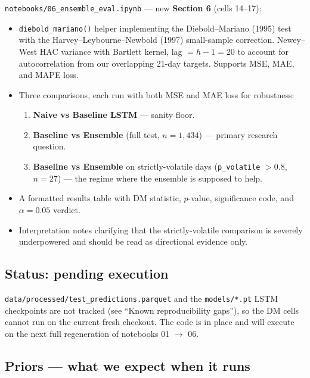 \documentclass[11pt]{article}
\begin{document}
\texttt{notebooks/06\_ensemble\_eval.ipynb} --- new \textbf{Section 6} (cells 14--17):

\begin{itemize}[leftmargin=*]
  \item \texttt{diebold\_mariano()} helper implementing the Diebold--Mariano (1995) test with the Harvey--Leybourne--Newbold (1997) small-sample correction. Newey--West HAC variance with Bartlett kernel, lag $= h - 1 = 20$ to account for autocorrelation from our overlapping 21-day targets. Supports MSE, MAE, and MAPE loss.
  \item Three comparisons, each run with both MSE and MAE loss for robustness:
  \begin{enumerate}
    \item \textbf{Naive vs Baseline LSTM} --- sanity floor.
    \item \textbf{Baseline vs Ensemble} (full test, $n=1{,}434$) --- primary research question.
    \item \textbf{Baseline vs Ensemble} on strictly-volatile days (\texttt{p\_volatile} $> 0.8$, $n=27$) --- the regime where the ensemble is supposed to help.
  \end{enumerate}
  \item A formatted results table with DM statistic, $p$-value, significance code, and $\alpha=0.05$ verdict.
  \item Interpretation notes clarifying that the strictly-volatile comparison is severely underpowered and should be read as directional evidence only.
\end{itemize}

\subsection*{Status: pending execution}

\texttt{data/processed/test\_predictions.parquet} and the \texttt{models/*.pt} LSTM checkpoints are not tracked (see ``Known reproducibility gaps''), so the DM cells cannot run on the current fresh checkout. The code is in place and will execute on the next full regeneration of notebooks 01 $\to$ 06.

\subsection*{Priors --- what we expect when it runs}
\end{document}
